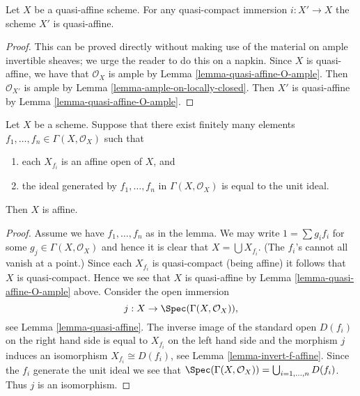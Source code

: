 \begin{lemma}
\label{lemma-quasi-affine-locally-closed}
Let $X$ be a quasi-affine scheme. For any quasi-compact immersion
$i : X' \to X$ the scheme $X'$ is quasi-affine.
\end{lemma}

\begin{proof}
This can be proved directly without making use of the material on
ample invertible sheaves; we urge the reader to do this on a napkin.
Since $X$ is quasi-affine, we have that $\mathcal{O}_X$ is ample by
Lemma \ref{lemma-quasi-affine-O-ample}.
Then $\mathcal{O}_{X'}$ is ample by
Lemma \ref{lemma-ample-on-locally-closed}. Then $X'$ is quasi-affine by
Lemma \ref{lemma-quasi-affine-O-ample}.
\end{proof}

\begin{lemma}
\label{lemma-characterize-affine}
Let $X$ be a scheme. Suppose that there exist finitely many elements
$f_1, \ldots, f_n \in \Gamma(X, \mathcal{O}_X)$ such that
\begin{enumerate}
\item each $X_{f_i}$ is an affine open of $X$, and
\item the ideal generated by $f_1, \ldots, f_n$ in
$\Gamma(X, \mathcal{O}_X)$ is equal to the unit ideal.
\end{enumerate}
Then $X$ is affine.
\end{lemma}

\begin{proof}
Assume we have $f_1, \ldots, f_n$ as in the lemma.
We may write $1 = \sum g_i f_i$ for some $g_j \in \Gamma(X, \mathcal{O}_X)$
and hence it is clear that $X = \bigcup X_{f_i}$. (The $f_i$'s cannot
all vanish at a point.) Since each $X_{f_i}$
is quasi-compact (being affine) it follows that $X$ is quasi-compact.
Hence we see that $X$ is quasi-affine by
Lemma \ref{lemma-quasi-affine-O-ample} above.
Consider the open immersion
$$
j : X \to \Spec(\Gamma(X, \mathcal{O}_X)),
$$
see Lemma \ref{lemma-quasi-affine}. The inverse image of the standard open
$D(f_i)$ on the right hand side is equal to $X_{f_i}$ on the
left hand side and the morphism $j$ induces an isomorphism
$X_{f_i} \cong D(f_i)$, see
Lemma \ref{lemma-invert-f-affine}. Since the $f_i$ generate the unit ideal
we see that $\Spec(\Gamma(X, \mathcal{O}_X))
= \bigcup_{i = 1, \ldots, n} D(f_i)$. Thus $j$ is an isomorphism.
\end{proof}







